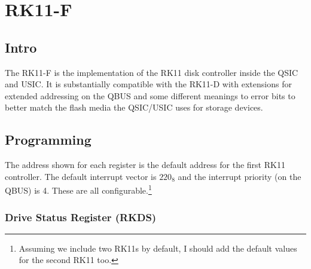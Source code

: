 %

\chapter{RK11-F}
\section{Intro}

The RK11-F is the implementation of the RK11 disk controller inside
the QSIC and USIC.  It is substantially compatible with the RK11-D
with extensions for extended addressing on the QBUS and some different
meanings to error bits to better match the flash media the QSIC/USIC
uses for storage devices.

\section{Programming}

The address shown for each register is the default address for the
first RK11 controller.  The default interrupt vector is $220_8$ and
the interrupt priority (on the QBUS) is 4.  These are all
configurable.\footnote{Assuming we include two RK11s by default, I
  should add the default values for the second RK11 too.}

\subsection{Drive Status Register (RKDS)}

\begin{register16}
\end{register16}

